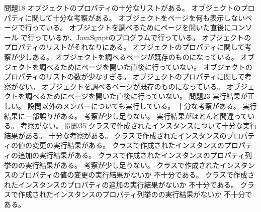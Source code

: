 \ProblemNN{


\ \vspace{0.15\textheight}


\Newpage


}
{{問題1}{8}{
 {オブジェクトのプロパティの十分なリストがある。}
 {オブジェクトのプロパティに関して十分な考察がある。}
 {オブジェクトをページを何も表示しないページで行っている。}
 {オブジェクトを調べるためにページを開いた直後にコンソール
 で行っているか、JavaSçriptのプログラムで行っている。}
 }
 {
 {オブジェクトのプロパティのリストがそれなりにある。}
 {オブジェクトのプロパティに関して考察が少しある。}
 {オブジェクトを調べるページが既存のものになっている。}
 {オブジェクトを調べるためにページを開いた直後に行っていない。}
 }
 {
 {オブジェクトのプロパティのリストの数が少なすぎる。}
 {オブジェクトのプロパティに関して考察がない。}
 {オブジェクトを調べるページが既存のものになっている。}
 {オブジェクトを調べるためにページを開いた直後に行っていない。}
 }
 {問題2}{3}{
 {実行結果が正しい。}
 {設問以外のメンバーについても実行している。}
 {十分な考察がある。}
 }
 {
 {実行結果に一部誤りがある。}
 {考察が少し足りない。}
 }
 {
 {実行結果がほとんど間違っている。}
 {考察がない。}
 }
 {問題3}{5}{
 {クラスで作成されたインスタンスについて十分な実行結果がある。}
 {十分な考察がある。}
 }
 {
 {クラスで作成されたインスタンスのプロパティの値の変更の実行結果がある。}
 {クラスで作成されたインスタンスのプロパティの追加の実行結果がある。}
 {クラスで作成されたインスタンスのプロパティ列挙のの実行結果がある。}
 {考察が少し足りない。}
 }
 {
 {クラスで作成されたインスタンスのプロパティの値の変更の実行結果がないか
 不十分である。}
 {クラスで作成されたインスタンスのプロパティの追加の実行結果がないか
 不十分である。}
 {クラスで作成されたインスタンスのプロパティ列挙のの実行結果がないか
 不十分である。}
}}
